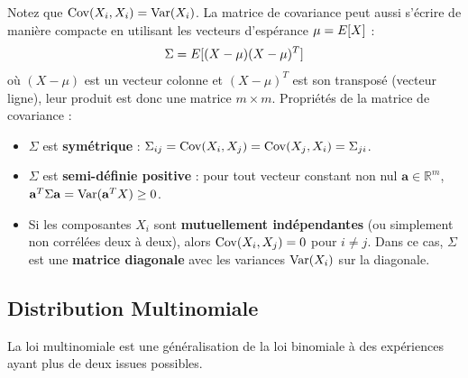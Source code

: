 Notez que $\operatorname{Cov}(X_i, X_i) = \operatorname{Var}(X_i)$. La matrice de covariance peut aussi s'écrire de manière compacte en utilisant les vecteurs d'espérance $\mu = E[X]$ :
\[
\Sigma = E[(X - \mu)(X - \mu)^T]
\]
où $(X - \mu)$ est un vecteur colonne et $(X - \mu)^T$ est son transposé (vecteur ligne), leur produit est donc une matrice $m \times m$. Propriétés de la matrice de covariance :
\begin{itemize}
    \item $\Sigma$ est \textbf{symétrique} : $\Sigma_{ij} = \operatorname{Cov}(X_i, X_j) = \operatorname{Cov}(X_j, X_i) = \Sigma_{ji}$.
    \item $\Sigma$ est \textbf{semi-définie positive} : pour tout vecteur constant non nul $\mathbf{a} \in \mathbb{R}^m$, $\mathbf{a}^T \Sigma \mathbf{a} = \operatorname{Var}(\mathbf{a}^T X) \ge 0$.
    \item Si les composantes $X_i$ sont \textbf{mutuellement indépendantes} (ou simplement non corrélées deux à deux), alors $\operatorname{Cov}(X_i, X_j) = 0$ pour $i \neq j$. Dans ce cas, $\Sigma$ est une \textbf{matrice diagonale} avec les variances $\operatorname{Var}(X_i)$ sur la diagonale.
\end{itemize}

\subsection{Distribution Multinomiale}

La loi multinomiale est une généralisation de la loi binomiale à des expériences ayant plus de deux issues possibles.

